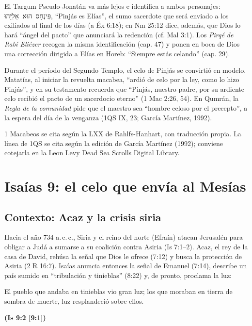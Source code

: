 \documentclass[11pt,letterpaper]{article}
\newcommand{\heb}[1]{\mbox{\foreignlanguage{hebrew}{#1}}}
\newcommand{\fuente}[1]{\par\hfill{\upshape\bfseries\small\textcolor{azul}{#1}}}
\begin{document}
El Targum Pseudo-Jonatán va más lejos e identifica a ambos personajes: \heb{פִּינְחָס הוּא אֵלִיָּהוּ}, ``Pinjás es Elías'', el sumo sacerdote que será enviado a los exiliados al final de los días (a Éx 6:18); en Nm 25:12 dice, además, que Dios lo hará ``ángel del pacto'' que anunciará la redención (cf. Mal 3:1). Los \emph{Pirqé de Rabí Eliézer} recogen la misma identificación (cap. 47) y ponen en boca de Dios una corrección dirigida a Elías en Horeb: ``Siempre estás celando'' (cap. 29).

Durante el período del Segundo Templo, el celo de Pinjás se convirtió en modelo. Matatías, al iniciar la revuelta macabea, ``ardió de celo por la ley, como lo hizo Pinjás'', y en su testamento recuerda que ``Pinjás, nuestro padre, por su ardiente celo recibió el pacto de un sacerdocio eterno'' (1 Mac 2:26, 54). En Qumrán, la \emph{Regla de la comunidad} pide que el maestro sea ``hombre celoso por el precepto'', a la espera del día de la venganza (1QS IX, 23; García Martínez, 1992).

\begin{nota}[Precisión]
1 Macabeos se cita según la LXX de Rahlfs-Hanhart, con traducción propia. La línea de 1QS se cita según la edición de García Martínez (1992); conviene cotejarla en la Leon Levy Dead Sea Scrolls Digital Library.
\end{nota}

\section{Isaías 9: el celo que envía al Mesías}

\subsection{Contexto: Acaz y la crisis siria}
Hacia el año 734 a.\,e.\,c., Siria y el reino del norte (Efraín) atacan Jerusalén para obligar a Judá a sumarse a su coalición contra Asiria (Is 7:1--2). Acaz, el rey de la casa de David, rehúsa la señal que Dios le ofrece (7:12) y busca la protección de Asiria (2 R 16:7). Isaías anuncia entonces la señal de Emanuel (7:14), describe un país sumido en ``tribulación y tinieblas'' (8:22) y, de pronto, proclama la luz:

\begin{cita}El pueblo que andaba en tinieblas vio gran luz; los que moraban en tierra de sombra de muerte, luz resplandeció sobre ellos.\fuente{(Is 9:2 [9:1])}\end{cita}
\end{document}
